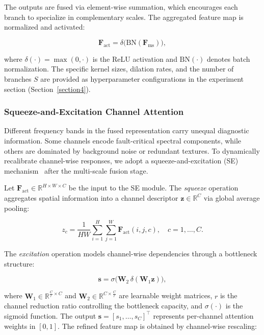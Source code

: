 \documentclass[journal]{IEEEtran}
\begin{document}
The outputs are fused via element-wise summation, which encourages each branch to specialize in complementary scales. The aggregated feature map is normalized and activated:

\begin{equation}
\boldsymbol{F}_{\mathrm{act}} = \delta\big(\mathrm{BN}(\boldsymbol{F}_{\mathrm{ms}})\big),
\label{eq:active_feature}
\end{equation}

where $\delta(\cdot) = \max(0, \cdot)$ is the ReLU activation and $\mathrm{BN}(\cdot)$ denotes batch normalization. The specific kernel sizes, dilation rates, and the number of branches $S$ are provided as hyperparameter configurations in the experiment section (Section~\ref{section4}).

\subsubsection{Squeeze-and-Excitation Channel Attention}

Different frequency bands in the fused representation carry unequal diagnostic information. Some channels encode fault-critical spectral components, while others are dominated by background noise or redundant textures. To dynamically recalibrate channel-wise responses, we adopt a squeeze-and-excitation (SE) mechanism~\cite{hu2018squeeze} after the multi-scale fusion stage.

Let $\boldsymbol{F}_{\mathrm{act}} \in \mathbb{R}^{H \times W \times C}$ be the input to the SE module. The \emph{squeeze} operation aggregates spatial information into a channel descriptor $\boldsymbol{z} \in \mathbb{R}^{C}$ via global average pooling:

\begin{equation}
z_c = \frac{1}{H W} \sum_{i=1}^{H} \sum_{j=1}^{W} \boldsymbol{F}_{\mathrm{act}}(i, j, c), \quad c = 1, \dots, C.
\label{eq:se_squeeze}
\end{equation}

The \emph{excitation} operation models channel-wise dependencies through a bottleneck structure:

\begin{equation}
\boldsymbol{s} = \sigma\big(\boldsymbol{W}_2 \, \delta(\boldsymbol{W}_1 \boldsymbol{z})\big),
\label{eq:se_excitation}
\end{equation}

where $\boldsymbol{W}_1 \in \mathbb{R}^{\frac{C}{r} \times C}$ and $\boldsymbol{W}_2 \in \mathbb{R}^{C \times \frac{C}{r}}$ are learnable weight matrices, $r$ is the channel reduction ratio controlling the bottleneck capacity, and $\sigma(\cdot)$ is the sigmoid function. The output $\boldsymbol{s} = [s_1, \dots, s_C]^\top$ represents per-channel attention weights in $[0, 1]$. The refined feature map is obtained by channel-wise rescaling:
\end{document}
